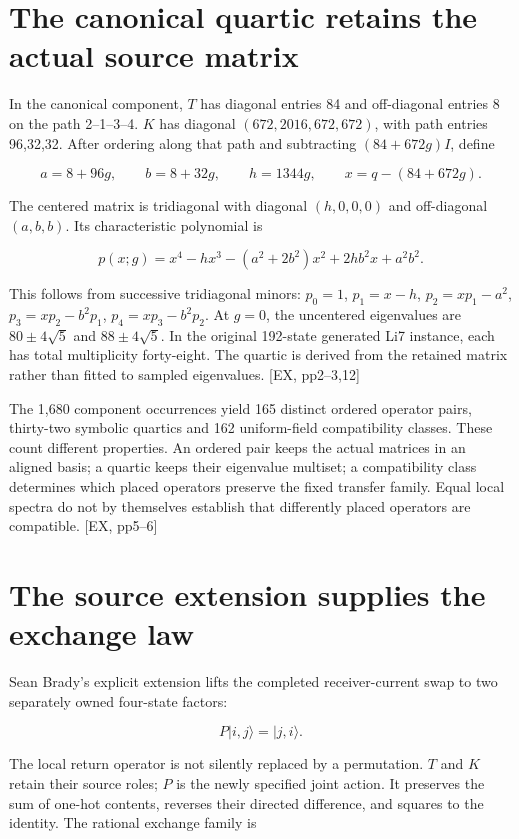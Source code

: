\section{The canonical quartic retains the actual source matrix}\label{the-canonical-quartic-retains-the-actual-source-matrix}

In the canonical component, \(T\) has diagonal entries 84 and off-diagonal entries 8 on the path 2--1--3--4. \(K\) has diagonal \((672,2016,672,672)\), with path entries 96,32,32. After ordering along that path and subtracting \((84+672g)I\), define

\[
a=8+96g,\qquad b=8+32g,\qquad h=1344g,\qquad x=q-(84+672g).
\]

The centered matrix is tridiagonal with diagonal \((h,0,0,0)\) and off-diagonal \((a,b,b)\). Its characteristic polynomial is

\[
p(x;g)=x^4-hx^3-(a^2+2b^2)x^2+2hb^2x+a^2b^2.
\]

This follows from successive tridiagonal minors: \(p_0=1\), \(p_1=x-h\), \(p_2=xp_1-a^2\), \(p_3=xp_2-b^2p_1\), \(p_4=xp_3-b^2p_2\). At \(g=0\), the uncentered eigenvalues are \(80\pm4\sqrt5\) and \(88\pm4\sqrt5\). In the original 192-state generated Li7 instance, each has total multiplicity forty-eight. The quartic is derived from the retained matrix rather than fitted to sampled eigenvalues. {[}EX, pp2--3,12{]}

The 1,680 component occurrences yield 165 distinct ordered operator pairs, thirty-two symbolic quartics and 162 uniform-field compatibility classes. These count different properties. An ordered pair keeps the actual matrices in an aligned basis; a quartic keeps their eigenvalue multiset; a compatibility class determines which placed operators preserve the fixed transfer family. Equal local spectra do not by themselves establish that differently placed operators are compatible. {[}EX, pp5--6{]}

\section{The source extension supplies the exchange law}\label{the-source-extension-supplies-the-exchange-law}

Sean Brady's explicit extension lifts the completed receiver-current swap to two separately owned four-state factors:

\[
P\lvert i,j\rangle=\lvert j,i\rangle.
\]

The local return operator is not silently replaced by a permutation. \(T\) and \(K\) retain their source roles; \(P\) is the newly specified joint action. It preserves the sum of one-hot contents, reverses their directed difference, and squares to the identity. The rational exchange family is

